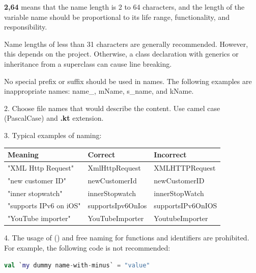 {{{{\textbf{{2,64}} means that the name length is 2 to 64 characters, and the length of the variable name should be proportional to its life range, functionality, and responsibility.

Name lengths of less than 31 characters are generally recommended. However, this depends on the project. Otherwise, a class declaration with generics or inheritance from a superclass can cause line breaking.

No special prefix or suffix should be used in names. The following examples are inappropriate names: name\_, mName, s\_name, and kName.



2.	Choose file names that would describe the content. Use camel case (PascalCase) and \textbf{.kt} extension.



3.	Typical examples of naming:



\begin{center}

\begin{tabular}{ |p{5.0cm}|p{5.0cm}|p{5.0cm}| }

\hline

Meaning&Correct&Incorrect\\

\hline

 "XML Http Request" & XmlHttpRequest & XMLHTTPRequest \\

 "new customer ID" & newCustomerId & newCustomerID \\

 "inner stopwatch" & innerStopwatch & innerStopWatch \\

 "supports IPv6 on iOS" & supportsIpv6OnIos & supportsIPv6OnIOS \\

 "YouTube importer" & YouTubeImporter & YoutubeImporter \\

\hline

\end{tabular}

\end{center}

4.	The usage of (\textbf{}) and free naming for functions and identifiers are prohibited. For example, the following code is not recommended:



\begin{lstlisting}[language=Kotlin]
val `my dummy name-with-minus` = "value" 
\end{lstlisting}


}}}}
